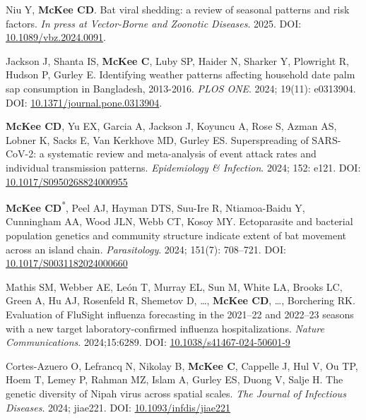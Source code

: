\documentclass{cv}
\begin{document}
\begin{pubenum}

\item Niu Y\textsuperscript{\ddag}, \textbf{McKee CD}. Bat viral shedding: a review of seasonal patterns and risk factors. \textit{In press at Vector-Borne and Zoonotic Diseases}. 2025. DOI: \href{https://doi.org/10.1089/vbz.2024.0091}{10.1089/vbz.2024.0091}.

\item Jackson J\textsuperscript{\ddag}, Shanta IS, \textbf{McKee C}, Luby SP, Haider N, Sharker Y, Plowright R, Hudson P, Gurley E. Identifying weather patterns affecting household date palm sap consumption in Bangladesh, 2013-2016. \textit{PLOS ONE}. 2024; 19(11): e0313904. DOI: \href{https://doi.org/10.1371/journal.pone.0313904}{10.1371/journal.pone.0313904}.

\item \textbf{McKee CD}, Yu EX, Garcia A\textsuperscript{\ddag}, Jackson J\textsuperscript{\ddag}, Koyuncu A, Rose S, Azman AS, Lobner K, Sacks E, Van Kerkhove MD, Gurley ES. Superspreading of SARS-CoV-2: a systematic review and meta-analysis of event attack rates and individual transmission patterns. \textit{Epidemiology \& Infection}. 2024; 152: e121. DOI: \href{https://doi.org/10.1017/S0950268824000955}{10.1017/S0950268824000955}

\item \textbf{McKee CD}\textsuperscript{*}, Peel AJ, Hayman DTS, Suu-Ire R, Ntiamoa-Baidu Y, Cunningham AA, Wood JLN, Webb CT, Kosoy MY. Ectoparasite and bacterial population genetics and community structure indicate extent of bat movement across an island chain. \textit{Parasitology}. 2024; 151(7): 708--721. DOI: \href{https://doi.org/10.1017/S0031182024000660}{10.1017/S0031182024000660}

\item Mathis SM, Webber AE, León T, Murray EL, Sun M, White LA, Brooks LC, Green A, Hu AJ, Rosenfeld R, Shemetov D, …, \textbf{McKee CD}, …, Borchering RK. Evaluation of FluSight influenza forecasting in the 2021--22 and 2022--23 seasons with a new target laboratory-confirmed influenza hospitalizations. \textit{Nature Communications}. 2024;15:6289. DOI: \href{https://doi.org/10.1038/s41467-024-50601-9}{10.1038/s41467-024-50601-9}

\item Cortes-Azuero O, Lefrancq N, Nikolay B, \textbf{McKee C}, Cappelle J, Hul V, Ou TP, Hoem T, Lemey P, Rahman MZ, Islam A, Gurley ES, Duong V, Salje H. The genetic diversity of Nipah virus across spatial scales. \textit{The Journal of Infectious Diseases}. 2024; jiae221. DOI: \href{https://doi.org/10.1093/infdis/jiae221}{10.1093/infdis/jiae221}


\end{pubenum}
\end{document}
